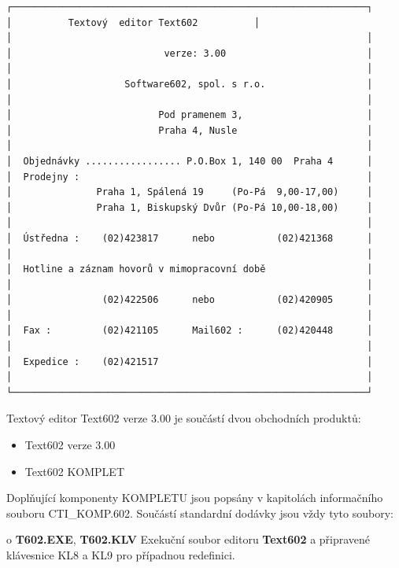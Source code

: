 \documentclass[11pt,a4paper]{article}
\begin{document}
\begin{verbatim}
┌───────────────────────────────────────────────────────────────┐
│          Textový  editor Text602          │
│                                                               │
│                           verze: 3.00                         │
│                                                               │
│                    Software602, spol. s r.o.                  │
│                                                               │
│                          Pod pramenem 3,                      │
│                          Praha 4, Nusle                       │
│                                                               │
│  Objednávky ................. P.O.Box 1, 140 00  Praha 4      │
│  Prodejny :                                                   │
│               Praha 1, Spálená 19     (Po-Pá  9,00-17,00)     │
│               Praha 1, Biskupský Dvůr (Po-Pá 10,00-18,00)     │
│                                                               │
│  Ústředna :    (02)423817      nebo           (02)421368      │
│                                                               │
│  Hotline a záznam hovorů v mimopracovní době                  │
│                                                               │
│                (02)422506      nebo           (02)420905      │
│                                                               │
│  Fax :         (02)421105      Mail602 :      (02)420448      │
│                                                               │
│  Expedice :    (02)421517                                     │
│                                                               │
└───────────────────────────────────────────────────────────────┘
\end{verbatim}

Textový editor Text602 verze 3.00 je součástí dvou obchodních produktů:

\begin{itemize}
\item Text602 verze 3.00
\item Text602 KOMPLET
\end{itemize}

Doplňující komponenty KOMPLETU jsou popsány v kapitolách informačního souboru CTI\_KOMP.602. Součástí standardní dodávky jsou vždy tyto soubory:

o \textbf{T602.EXE}, \textbf{T602.KLV} Exekuční soubor editoru \textbf{Text602} a připravené klávesnice KL8 a KL9 pro případnou redefinici.
\end{document}
